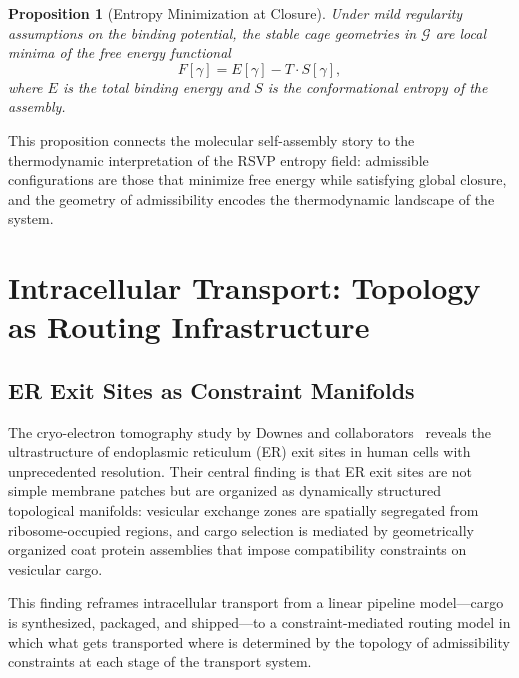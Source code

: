 \documentclass[11pt, oneside]{article}
\numberwithin{equation}{section}
\theoremstyle{rsvpstyle}
\newtheorem{proposition}[theorem]{Proposition}
\theoremstyle{remark}
\begin{document}
\begin{proposition}[Entropy Minimization at Closure]
Under mild regularity assumptions on the binding potential, the stable cage geometries
in $\mathcal{G}$ are local minima of the free energy functional
\begin{equation}
  F[\gamma] = E[\gamma] - T \cdot S[\gamma],
\end{equation}
where $E$ is the total binding energy and $S$ is the conformational entropy of the
assembly.
\end{proposition}

This proposition connects the molecular self-assembly story to the thermodynamic
interpretation of the RSVP entropy field: admissible configurations are those that
minimize free energy while satisfying global closure, and the geometry of admissibility
encodes the thermodynamic landscape of the system.

\section{Intracellular Transport: Topology as Routing Infrastructure}

\subsection{ER Exit Sites as Constraint Manifolds}

The cryo-electron tomography study by Downes and collaborators~\cite{Downes2026ERES}
reveals the ultrastructure of endoplasmic reticulum (ER) exit sites in human cells with
unprecedented resolution. Their central finding is that ER exit sites are not simple
membrane patches but are organized as dynamically structured topological manifolds:
vesicular exchange zones are spatially segregated from ribosome-occupied regions, and
cargo selection is mediated by geometrically organized coat protein assemblies that
impose compatibility constraints on vesicular cargo.

This finding reframes intracellular transport from a linear pipeline model---cargo is
synthesized, packaged, and shipped---to a constraint-mediated routing model in which
what gets transported where is determined by the topology of admissibility constraints
at each stage of the transport system.
\end{document}

